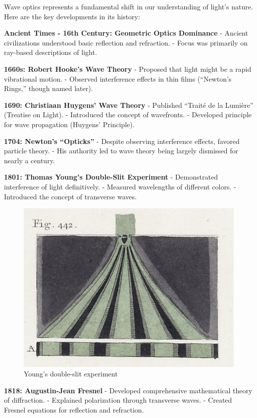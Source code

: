 \documentclass[
  a4paper,
]{book}
\begin{document}
\begin{tcolorbox}[enhanced jigsaw, coltitle=black, title=\textcolor{quarto-callout-note-color}{\faInfo}\hspace{0.5em}{Historical Development of Scalar Wave Optics}, colframe=quarto-callout-note-color-frame, toprule=.15mm, opacitybacktitle=0.6, left=2mm, opacityback=0, breakable, toptitle=1mm, bottomtitle=1mm, leftrule=.75mm, arc=.35mm, titlerule=0mm, colbacktitle=quarto-callout-note-color!10!white, rightrule=.15mm, bottomrule=.15mm, colback=white]

Wave optics represents a fundamental shift in our understanding of
light's nature. Here are the key developments in its history:

\textbf{Ancient Times - 16th Century: Geometric Optics Dominance} -
Ancient civilizations understood basic reflection and refraction. -
Focus was primarily on ray-based descriptions of light.

\textbf{1660s: Robert Hooke's Wave Theory} - Proposed that light might
be a rapid vibrational motion. - Observed interference effects in thin
films (``Newton's Rings,'' though named later).

\textbf{1690: Christiaan Huygens' Wave Theory} - Published ``Traité de
la Lumière'' (Treatise on Light). - Introduced the concept of
wavefronts. - Developed principle for wave propagation (Huygens'
Principle).

\textbf{1704: Newton's ``Opticks''} - Despite observing interference
effects, favored particle theory. - His authority led to wave theory
being largely dismissed for nearly a century.

\textbf{1801: Thomas Young's Double-Slit Experiment} - Demonstrated
interference of light definitively. - Measured wavelengths of different
colors. - Introduced the concept of transverse waves.

\begin{figure}[H]

{\centering \includegraphics[width=0.5\linewidth,height=\textheight,keepaspectratio]{wave-optics/img/youngs_exp.png}

}

\caption{Young's double-slit experiment}

\end{figure}%

\textbf{1818: Augustin-Jean Fresnel} - Developed comprehensive
mathematical theory of diffraction. - Explained polarization through
transverse waves. - Created Fresnel equations for reflection and
refraction.

\end{tcolorbox}
\end{document}
